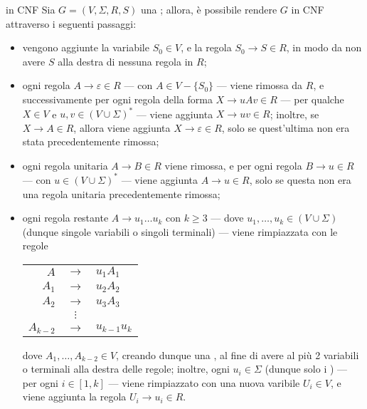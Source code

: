 \documentclass[a4paper, 12pt]{report}
\begin{document}
    \begin{framedmeth}[label={cfg into cnf}, breakable]{\CFG in CNF}
        Sia $G = (V, \Sigma, R, S)$ una \CFG; allora, è possibile rendere $G$ in CNF attraverso i seguenti passaggi:

        \begin{itemize}
            \item vengono aggiunte la variabile $S_0 \in V$, e la regola $S_0 \to S \in R$, in modo da non avere $S$ alla destra di nessuna regola in $R$;
            \item ogni regola $A \to \varepsilon \in R$ --- con $A \in V - \{S_0\}$ --- viene rimossa da $R$, e successivamente per ogni regola della forma $X \to uAv \in R$ --- per qualche $X \in V$ e $u, v \in (V \cup \Sigma)^*$ --- viene aggiunta $X \to uv \in R$; inoltre, se $X \to A \in R$, allora viene aggiunta $X \to \varepsilon \in R$, solo se quest'ultima non era stata precedentemente rimossa;
            \item ogni regola unitaria $A \to B \in R$ viene rimossa, e per ogni regola $B \to u \in R$ --- con $u \in (V \cup \Sigma)^*$ --- viene aggiunta $A \to u \in R$, solo se questa non era una regola unitaria precedentemente rimossa;
            \item ogni regola restante $A \to u_1 \ldots u_k$ con $k \ge 3$ --- dove $u_1, \ldots, u_k \in (V \cup \Sigma)$ (dunque singole variabili o singoli terminali) --- viene rimpiazzata con le regole

                \begin{center}
                    \begin{tabular}{rcl}
                        $A$ & $\to$ & $u_1 A_1$ \\
                        $A_1$ & $\to$ & $u_2 A_2$ \\
                        $A_2$ & $\to$ & $u_3 A_3$ \\
                              & $\vdots$ & \\
                        $A_{k - 2}$ & $\to$ & $u_{k - 1}u_k$
                    \end{tabular}
                \end{center}

                dove $A_1, \ldots, A_{k - 2} \in V$, creando dunque una , al fine di avere al più 2 variabili o terminali alla destra delle regole; inoltre, ogni $u_i \in \Sigma$ (dunque solo i ) --- per ogni $i \in [1, k]$ --- viene rimpiazzato con una nuova varibile $U_i \in V$, e viene aggiunta la regola $U_i \to u_i \in R$.
        \end{itemize}
    \end{framedmeth}
\end{document}
